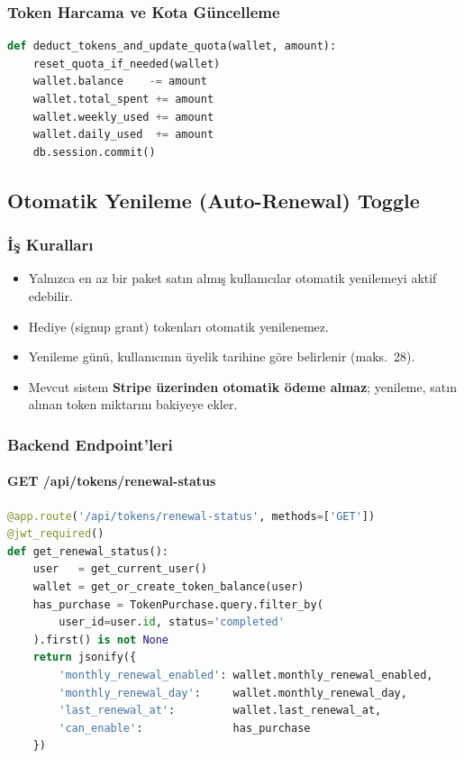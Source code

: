 \documentclass[12pt,a4paper]{article}
\begin{document}
\subsubsection{Token Harcama ve Kota G\"{u}ncelleme}
\begin{lstlisting}[language=Python, caption={Token d\"{u}\c{s}me fonksiyonu}]
def deduct_tokens_and_update_quota(wallet, amount):
    reset_quota_if_needed(wallet)
    wallet.balance    -= amount
    wallet.total_spent += amount
    wallet.weekly_used += amount
    wallet.daily_used  += amount
    db.session.commit()
\end{lstlisting}

\subsection{Otomatik Yenileme (Auto-Renewal) Toggle}

\subsubsection{\.{I}\c{s} Kurallar{\i}}
\begin{itemize}
  \item Yaln{\i}zca en az bir paket sat{\i}n alm{\i}\c{s} kullan{\i}c{\i}lar otomatik yenilemeyi aktif edebilir.
  \item Hediye (signup grant) tokenlar{\i} otomatik yenilenemez.
  \item Yenileme g\"{u}n\"{u}, kullan{\i}c{\i}n{\i}n \"{u}yelik tarihine g\"{o}re belirlenir (maks.\ 28).
  \item Mevcut sistem \textbf{Stripe \"{u}zerinden otomatik \"{o}deme almaz}; yenileme, sat{\i}n al{\i}nan token
        miktar{\i}n{\i} bakiyeye ekler.
\end{itemize}

\subsubsection{Backend Endpoint'leri}

\paragraph{GET /api/tokens/renewal-status}
\begin{lstlisting}[language=Python, caption={Renewal status GET endpoint}]
@app.route('/api/tokens/renewal-status', methods=['GET'])
@jwt_required()
def get_renewal_status():
    user   = get_current_user()
    wallet = get_or_create_token_balance(user)
    has_purchase = TokenPurchase.query.filter_by(
        user_id=user.id, status='completed'
    ).first() is not None
    return jsonify({
        'monthly_renewal_enabled': wallet.monthly_renewal_enabled,
        'monthly_renewal_day':     wallet.monthly_renewal_day,
        'last_renewal_at':         wallet.last_renewal_at,
        'can_enable':              has_purchase
    })
\end{lstlisting}
\end{document}
